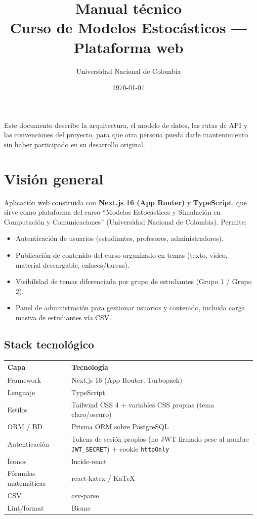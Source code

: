 \documentclass[11pt,a4paper]{article}
\title{\textbf{Manual técnico}\\[4pt]\large Curso de Modelos Estocásticos --- Plataforma web}
\author{Universidad Nacional de Colombia}
\date{\today}
\newcommand{\code}[1]{\texttt{#1}}
\begin{document}
\maketitle
\thispagestyle{fancy}

\tableofcontents
\newpage

Este documento describe la arquitectura, el modelo de datos, las rutas de API y las convenciones del proyecto, para que otra persona pueda darle mantenimiento sin haber participado en su desarrollo original.

\section{Visión general}

Aplicación web construida con \textbf{Next.js 16 (App Router)} y \textbf{TypeScript}, que sirve como plataforma del curso ``Modelos Estocásticos y Simulación en Computación y Comunicaciones'' (Universidad Nacional de Colombia). Permite:

\begin{itemize}
  \item Autenticación de usuarios (estudiantes, profesores, administradores).
  \item Publicación de contenido del curso organizado en temas (texto, video, material descargable, enlaces/tareas).
  \item Visibilidad de temas diferenciada por grupo de estudiantes (Grupo 1 / Grupo 2).
  \item Panel de administración para gestionar usuarios y contenido, incluida carga masiva de estudiantes vía CSV.
\end{itemize}

\subsection*{Stack tecnológico}

\begin{longtable}{@{}p{4cm}p{10cm}@{}}
\toprule
\textbf{Capa} & \textbf{Tecnología} \\
\midrule
\endhead
Framework & Next.js 16 (App Router, Turbopack) \\
Lenguaje & TypeScript \\
Estilos & Tailwind CSS 4 + variables CSS propias (tema claro/oscuro) \\
ORM / BD & Prisma ORM sobre PostgreSQL \\
Autenticación & Tokens de sesión propios (no JWT firmado pese al nombre \code{JWT\_SECRET}) + cookie \code{httpOnly} \\
Íconos & lucide-react \\
Fórmulas matemáticas & react-katex / KaTeX \\
CSV & csv-parse \\
Lint/format & Biome \\
\bottomrule
\end{longtable}
\end{document}
